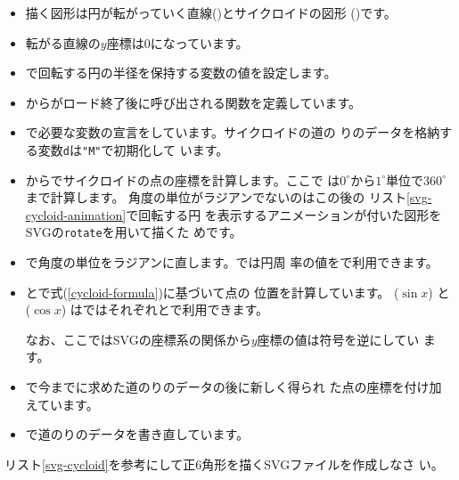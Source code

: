 \begin{itemize}
 \item 描く図形は円が転がっていく直線()とサイクロイドの図形
       ()です。
 \item 転がる直線の$y$座標は$0$になっています。
 \item {}で回転する円の半径を保持する変数の値を設定します。
 \item {}から\SVG がロード終了後に呼び出される関数を定義しています。
 \item {}で必要な変数の宣言をしています。サイクロイドの道の
       りのデータを格納する変数\texttt{d}は\texttt{"M"}で初期化して
       います。
 \item {}からでサイクロイドの点の座標を計算します。ここで
は$0^{\circ}$から$1^{\circ}$単位で$360^{\circ}$まで計算します。
角度の単位がラジアンでないのはこの後の
リスト\ref{svg-cycloid-animation}で回転する円
を表示するアニメーションが付いた図形をSVGの\texttt{rotate}を用いて描くた
めです。
 \item {}で角度の単位をラジアンに直します。\JS では円周
       率の値をで利用できます。
 \item {}とで式(\ref{cycloid-formula})に基づいて点の
       位置を計算しています。
       ($\sin{x}$)
       と($\cos{x}$)
			 は\JS ではそれぞれとで利用できます。

       なお、ここではSVGの座標系の関係から$y$座標の値は符号を逆にしてい
       ます。
 \item {}で今までに求めた道のりのデータの後に新しく得られ
       た点の座標を付け加えています。
 \item {}で道のりのデータを書き直しています。
\end{itemize}
\begin{Problem}\upshape
 リスト\ref{svg-cycloid}を参考にして正6角形を描くSVGファイルを作成しなさ
 い。
\end{Problem}